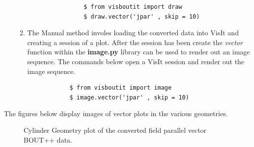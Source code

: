 \documentclass[12pt,a4paper]{article}
\begin{document}
\begin{enumerate}
\begin{enumerate}
{			\begin{verbatim}
				$ from visboutit import draw
				$ draw.vector('jpar' , skip = 10)
			\end{verbatim}}
		
		\item{The Manual method involes loading the converted data into VisIt and creating a session of a plot. After the session has been create the \textit{vector} function within the \textbf{image.py} library can be used to render out an image sequence. The commands below open a VisIt session and render out the image sequence.
			
			\begin{verbatim}
			$ from visboutit import image
			$ image.vector('jpar' , skip = 10)
			\end{verbatim}
		}
			
	\end{enumerate}
\end{enumerate}
The figures below display images of vector plots in the various geometries.


\begin{figure}[H]
	\centering
	\caption{Cylinder Geometry plot of the converted field parallel vector BOUT++ data.}
	\label{fig:cylinder_vector}
\end{figure}
\end{document}
